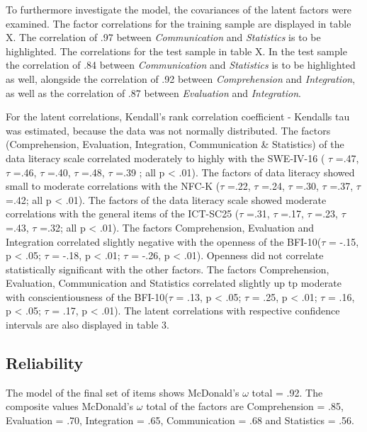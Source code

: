 \documentclass[
  12pt,
  a4paper,
  twoside]{article}
\begin{document}
To furthermore investigate the model, the covariances of the latent factors were examined. The factor correlations for the training sample are displayed in table X. The correlation of .97 between \emph{Communication} and \emph{Statistics} is to be highlighted. The correlations for the test sample in table X. In the test sample the correlation of .84 between \emph{Communication} and \emph{Statistics} is to be highlighted as well, alongside the correlation of .92 between \emph{Comprehension} and \emph{Integration}, as well as the correlation of .87 between \emph{Evaluation} and \emph{Integration}.

For the latent correlations, Kendall's rank correlation coefficient - Kendalls tau was estimated, because the data was not normally distributed. The factors (Comprehension, Evaluation, Integration, Communication \& Statistics) of the data literacy scale correlated moderately to highly with the SWE-IV-16 ( \(\tau\) =.47, \(\tau\) =.46, \(\tau\) =.40, \(\tau\) =.48, \(\tau\) =.39 ; all p \textless{} .01). The factors of data literacy showed small to moderate correlations with the NFC-K (\(\tau\) =.22, \(\tau\) =.24, \(\tau\) =.30, \(\tau\) =.37, \(\tau\) =.42; all p \textless{} .01). The factors of the data literacy scale showed moderate correlations with the general items of the ICT-SC25 (\(\tau\) =.31, \(\tau\) =.17, \(\tau\) =.23, \(\tau\) =.43, \(\tau\) =.32; all p \textless{} .01). The factors Comprehension, Evaluation and Integration correlated slightly negative with the openness of the BFI-10(\(\tau\) = -.15, p \textless{} .05; \(\tau\) = -.18, p \textless{} .01; \(\tau\) = -.26, p \textless{} .01). Openness did not correlate statistically significant with the other factors. The factors Comprehension, Evaluation, Communication and Statistics correlated slightly up tp moderate with conscientiousness of the BFI-10(\(\tau\) = .13, p \textless{} .05; \(\tau\) = .25, p \textless{} .01; \(\tau\) = .16, p \textless{} .05; \(\tau\) = .17, p \textless{} .01). The latent correlations with respective confidence intervals are also displayed in table 3.

\subsection{Reliability}\label{reliability}

The model of the final set of items shows McDonald's \(\omega\) total = .92. The composite values McDonald's \(\omega\) total of the factors are Comprehension = .85, Evaluation = .70, Integration = .65, Communication = .68 and Statistics = .56.
\end{document}
